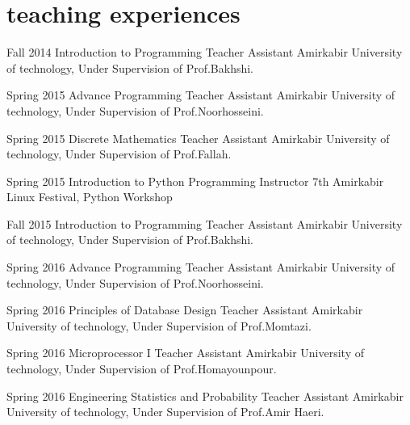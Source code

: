 \documentclass[]{friggeri-cv} %
\begin{document}

\section{teaching experiences}

\begin{entrylist}

\entry
{Fall 2014}
{Introduction to Programming}
{Teacher Assistant}
{Amirkabir University of technology, Under Supervision of Prof.Bakhshi.}


\entry
{Spring 2015}
{Advance Programming}
{Teacher Assistant}
{Amirkabir University of technology, Under Supervision of Prof.Noorhosseini.}


\entry
{Spring 2015}
{Discrete Mathematics}
{Teacher Assistant}
{Amirkabir University of technology, Under Supervision of Prof.Fallah.}


\entry
{Spring 2015}
{Introduction to Python Programming}
{Instructor}
{7th Amirkabir Linux Festival, Python Workshop}



\entry
{Fall 2015}
{Introduction to Programming}
{Teacher Assistant}
{Amirkabir University of technology, Under Supervision of Prof.Bakhshi.}


\entry
{Spring 2016}
{Advance Programming}
{Teacher Assistant}
{Amirkabir University of technology, Under Supervision of Prof.Noorhosseini.}


\entry
{Spring 2016}
{Principles of Database Design}
{Teacher Assistant}
{Amirkabir University of technology, Under Supervision of Prof.Momtazi.}


\entry
{Spring 2016}
{Microprocessor I}
{Teacher Assistant}
{Amirkabir University of technology, Under Supervision of Prof.Homayounpour.}


\entry
{Spring 2016}
{Engineering Statistics and Probability}
{Teacher Assistant}
{Amirkabir University of technology, Under Supervision of Prof.Amir Haeri.}



\end{entrylist}
\end{document}

